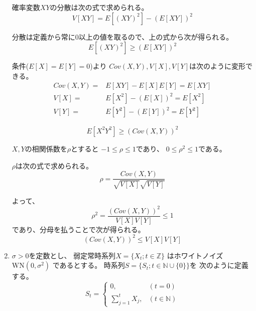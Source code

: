 \documentclass[12pt,b5paper]{ltjsarticle}
\begin{document}
\begin{enumerate}
      確率変数$XY$の分散は次の式で求められる。
      \begin{equation}
       V[XY]=E[(XY)^2]-(E[XY])^2
      \end{equation}

      分散は定義から常に0以上の値を取るので、上の式から次が得られる。
      \begin{equation}
       E[(XY)^2] \geq (E[XY])^2
      \end{equation}

      条件($E[X]=E[Y]=0$)より
      $Cov(X,Y),V[X],V[Y]$は次のように変形できる。
      \begin{align}
       Cov(X,Y) =& E[XY]- E[X]E[Y]=E[XY]\\
        V[X] =& E[X^2]- (E[X])^2=E[X^2]\\
        V[Y] =& E[Y^2]- (E[Y])^2=E[Y^2]
      \end{align}

      \begin{equation}
       E[X^2Y^2] \geq (Cov(X,Y))^2
      \end{equation}

      $X,Y$の相関係数を$\rho$とすると
      $-1\leq \rho \leq 1$であり、
      $0 \leq \rho^2 \leq 1$である。

      $\rho$は次の式で求められる。
      \begin{equation}
       \rho = \frac{Cov(X,Y)}{\sqrt{V[X]}\sqrt{V[Y]}}
      \end{equation}


      よって、
      \begin{equation}
       \rho^2=\frac{(Cov(X,Y))^2}{V[X]V[Y]}\leq 1
      \end{equation}
      であり、分母を払うことで次が得られる。
      \begin{equation}
       (Cov(X,Y))^2 \leq V[X]V[Y]
      \end{equation}


\hrulefill

 \item
      $\sigma >0$を定数とし、
      弱定常時系列$X=\{X_{t};t\in\mathbb{Z}\}$
      はホワイトノイズ$\mathrm{WN}(0,\sigma^2)$
      であるとする。
      時系列$S=\{S_{t};t\in\mathbb{N}\cup\{0\}\}$を
      次のように定義する。
      \begin{equation}
       S_{t}=
        \begin{cases}
         0, & (t=0)\\
         \sum_{j=1}^{t}X_{j}, & (t\in\mathbb{N})
        \end{cases}
      \end{equation}
      \dotfill


\end{enumerate}
\end{document}
